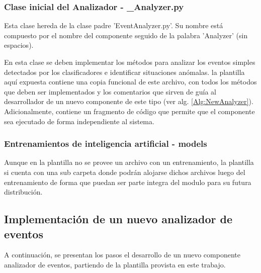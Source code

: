         \subsubsection{Clase inicial del Analizador - \_Analyzer.py}
        \label{sub2:classFileAnalyzer}
            Esta clase hereda de la clase padre 'EventAnalyzer.py'. Su nombre está compuesto por el nombre del componente seguido de la palabra 'Analyzer' (sin espacios).
            
            En esta clase se deben implementar los métodos para analizar los eventos simples detectados por los clasificadores e identificar situaciones anómalas. la plantilla aquí expuesta contiene una copia funcional de este archivo, con todos los métodos que deben ser implementados y los comentarios que sirven de guía al desarrollador de un nuevo componente de este tipo (ver alg. \ref{Alg:NewAnalyzer}). Adicionalmente, contiene un fragmento de código que permite que el componente sea ejecutado de forma independiente al sistema.
            
            

        \subsubsection{Entrenamientos de inteligencia artificial - models}
        \label{sub2:modelFileAnalyzer}
            Aunque en la plantilla no se provee un archivo con un entrenamiento, la plantilla si cuenta con una sub carpeta donde podrán alojarse dichos archivos luego del entrenamiento de forma que puedan ser parte integra del modulo para su futura distribución.
        
    \subsection{Implementación de un nuevo analizador de eventos}
    \label{sub:DevelopingAnalyzer}
        
        A continuación, se presentan los pasos el desarrollo de un nuevo componente analizador de eventos, partiendo de la plantilla provista en este trabajo.
    
